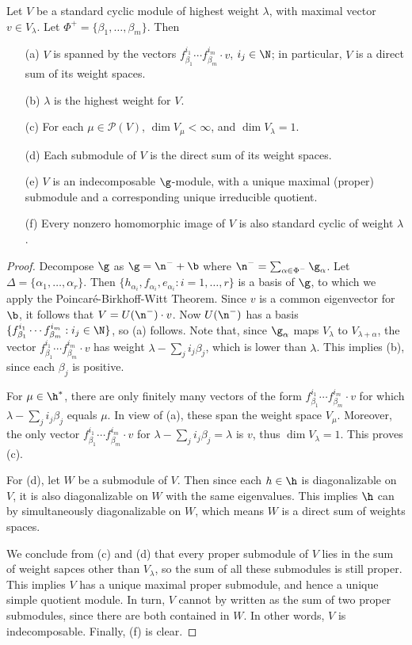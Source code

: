 \begin{theorem}\label{Lie algebra standard cyclic module prop}
Let $V$ be a standard cyclic module of highest weight $\lambda$, with maximal vector $v\in V_\lambda$. Let $\Phi^+=\{\beta_1,\dots,\beta_m\}$. Then
\begin{itemize}
\item[(a)] $V$ is spanned by the vectors $f_{\beta_1}^{i_1}\cdots f_{\beta_m}^{i_m}\cdot v$, $i_j\in\N$; in particular, $V$ is a direct sum of its weight spaces.
\item[(b)] $\lambda$ is the highest weight for $V$.
\item[(c)] For each $\mu\in\mathcal{P}(V)$, $\dim V_\mu<\infty$, and $\dim V_\lambda=1$.
\item[(d)] Each submodule of $V$ is the direct sum of its weight spaces.
\item[(e)] $V$ is an indecomposable $\g$-module, with a unique maximal (proper) submodule and a corresponding unique irreducible quotient.
\item[(f)] Every nonzero homomorphic image of $V$ is also standard cyclic of weight $\lambda$. 
\end{itemize}
\end{theorem}
\begin{proof}
Decompose $\g$ as $\g=\n^-+\b$ where $\n^-=\sum_{\alpha\in\Phi^-}\g_\alpha$. Let $\Delta=\{\alpha_1,\dots,\alpha_r\}$. Then $\{h_{\alpha_i},f_{\alpha_i},e_{\alpha_i}:i=1,\dots,r\}$ is a basis of $\g$, to which we apply the Poincar\'e-Birkhoff-Witt Theorem. Since $v$ is a common eigenvector for $\b$, it follows that $V=U(\n^-)\cdot v$. Now $U(\n^-)$ has a basis $\{f_{\beta_1}^{i_1}\cdots f_{\beta_m}^{i_m}:i_j\in\N\}$, so (a) follows. Note that, since $\g_\alpha$ maps $V_\lambda$ to $V_{\lambda+\alpha}$, the vector $f_{\beta_1}^{i_1}\cdots f_{\beta_m}^{i_m}\cdot v$ has weight $\lambda-\sum_ji_j\beta_j$, which is lower than $\lambda$. This implies (b), since each $\beta_j$ is positive.\par
For $\mu\in\h^*$, there are only finitely many vectors of the form $f_{\beta_1}^{i_1}\cdots f_{\beta_m}^{i_m}\cdot v$ for which $\lambda-\sum_ji_j\beta_j$ equals $\mu$. In view of (a), these span the weight space $V_\mu$. Moreover, the only vector $f_{\beta_1}^{i_1}\cdots f_{\beta_m}^{i_m}\cdot v$ for $\lambda-\sum_ji_j\beta_j=\lambda$ is $v$, thus $\dim V_\lambda=1$. This proves (c).\par
For (d), let $W$ be a submodule of $V$. Then since each $h\in\h$ is diagonalizable on $V$, it is also diagonalizable on $W$ with the same eigenvalues. This implies $\h$ can by simultaneously diagonalizable on $W$, which means $W$ is a direct sum of weights spaces.\par
We conclude from (c) and (d) that every proper submodule of $V$ lies in the sum of weight sapces other than $V_\lambda$, so the sum of all these submodules is still proper. This implies $V$ has a unique maximal proper submodule, and hence a unique simple quotient module. In turn, $V$ cannot by written as the sum of two proper submodules, since there are both contained in $W$. In other words, $V$ is indecomposable. Finally, (f) is clear.
\end{proof}
